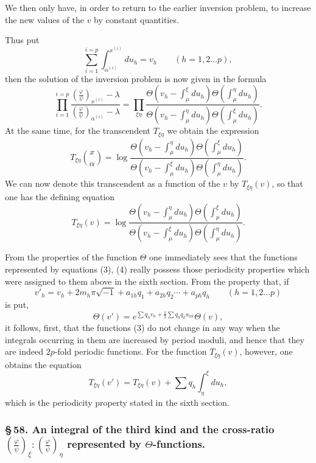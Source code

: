 \documentclass[10pt]{article}
\begin{document}
We then only have, in order to return to the earlier inversion problem, to increase the new values of the \(v\) by constant quantities.

Thus put
\[
\sum_{i=1}^{i=p}\int_{\alpha^{(i)}}^{x^{(i)}}du_h=v_h\qquad(h=1,2\ldots p),
\]
then the solution of the inversion problem is now given in the formula
\[
\tag{3}
\prod_{i=1}^{i=p}\frac{\left(\frac{\varphi}{\psi}\right)_{x^{(i)}}-\lambda}
{\left(\frac{\varphi}{\psi}\right)_{\alpha^{(i)}}-\lambda}
=
\prod_{\xi\eta}
\frac{\Theta\!\left(v_h-\int_{\mu}^{\xi}du_h\right)\Theta\!\left(\int_{\mu}^{\eta}du_h\right)}
{\Theta\!\left(v_h-\int_{\mu}^{\eta}du_h\right)\Theta\!\left(\int_{\mu}^{\xi}du_h\right)}.
\]
At the same time, for the transcendent \(T_{\xi\eta}\) we obtain the expression
\[
T_{\xi\eta}\binom{x}{\alpha}
=\log
\frac{\Theta\!\left(v_h-\int_{\mu}^{\eta}du_h\right)\Theta\!\left(\int_{\mu}^{\xi}du_h\right)}
{\Theta\!\left(v_h-\int_{\mu}^{\xi}du_h\right)\Theta\!\left(\int_{\mu}^{\eta}du_h\right)}.
\]
We can now denote this transcendent as a function of the \(v\) by \(T_{\xi\eta}(v)\), so that one has the defining equation
\[
\tag{4}
T_{\xi\eta}(v)=\log
\frac{\Theta\!\left(v_h-\int_{\mu}^{\eta}du_h\right)\Theta\!\left(\int_{\mu}^{\xi}du_h\right)}
{\Theta\!\left(v_h-\int_{\mu}^{\xi}du_h\right)\Theta\!\left(\int_{\mu}^{\eta}du_h\right)}.
\]

From the properties of the function \(\Theta\) one immediately sees that the functions represented by equations (3), (4) really possess those periodicity properties which were assigned to them above in the sixth section. From the property that, if
\[
v'_h=v_h+2m_h\pi\sqrt{-1}+a_{1h}q_1+a_{2h}q_2\cdots+a_{ph}q_h
\qquad(h=1,2\ldots p)
\]
is put,
\[
\Theta(v')=e^{\sum q_hv_h+\frac12\sum q_hq_ka_{hk}}\Theta(v),
\]
it follows, first, that the functions (3) do not change in any way when the integrals occurring in them are increased by period moduli, and hence that they are indeed \(2p\)-fold periodic functions. For the function \(T_{\xi\eta}(v)\), however, one obtains the equation
\[
T_{\xi\eta}(v')=T_{\xi\eta}(v)+\sum q_h\int_{\eta}^{\xi}du_h,
\]
which is the periodicity property stated in the sixth section.

\subsubsection*{\S\,58. An integral of the third kind and the cross-ratio \(\left(\frac{\varphi}{\psi}\right)_{\xi}:\left(\frac{\varphi}{\psi}\right)_{\eta}\) represented by \(\Theta\)-functions.}
\end{document}
